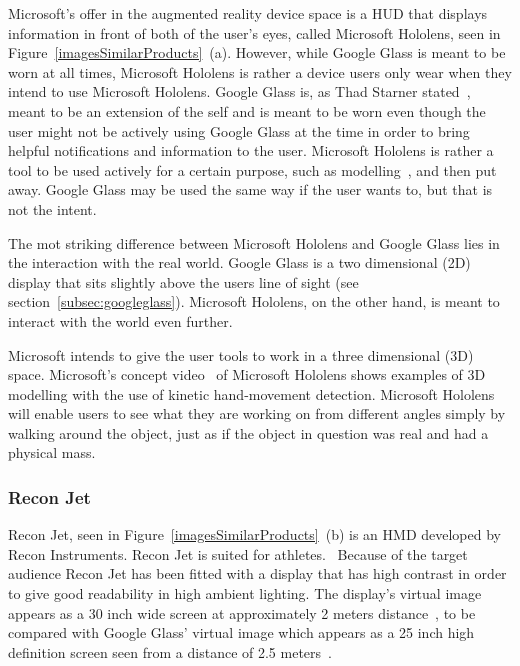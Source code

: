 Microsoft's offer in the augmented reality device space is a HUD that displays information in front of both of the user's eyes, called Microsoft Hololens, seen in Figure~\ref{imagesSimilarProducts}~(a). 
However, while Google Glass is meant to be worn at all times, Microsoft Hololens is rather a device users only wear when they intend to use Microsoft Hololens. Google Glass is, as Thad Starner stated~\cite{6504855}, meant to be an extension of the self and is meant to be worn even though the user might not be actively using Google Glass at the time in order to bring helpful notifications and information to the user. Microsoft Hololens is rather a tool to be used actively for a certain purpose, such as modelling~\cite{hololensDemo}, and then put away. Google Glass may be used the same way if the user wants to, but that is not the intent.

The mot striking difference between Microsoft Hololens and Google Glass lies in the interaction with the real world. Google Glass is a two dimensional (2D) display that sits slightly above the users line of sight (see section~\ref{subsec:googleglass}). Microsoft Hololens, on the other hand, is meant to interact with the world even further.

Microsoft intends to give the user tools to work in a three dimensional (3D) space. Microsoft's concept video~\cite{hololensConceptVideo} of Microsoft Hololens shows examples of 3D modelling with the use of kinetic hand-movement detection. Microsoft Hololens will enable users to see what they are working on from different angles simply by walking around the object, just as if the object in question was real and had a physical mass.

\subsubsection{Recon Jet~\cite{reconJet}}

Recon Jet, seen in Figure~\ref{imagesSimilarProducts}~(b) is an HMD developed by Recon Instruments. Recon Jet is suited for athletes.~\cite{reconJet} Because of the target audience Recon Jet has been fitted with a display that has high contrast in order to give good readability in high ambient lighting. The display's virtual image appears as  a 30 inch wide screen at approximately 2 meters distance~\cite{reconJetSpecs}, to be compared with Google Glass' virtual image which appears as a 25 inch high definition screen seen from a distance of 2.5 meters~\cite{GlassSpecs}.

